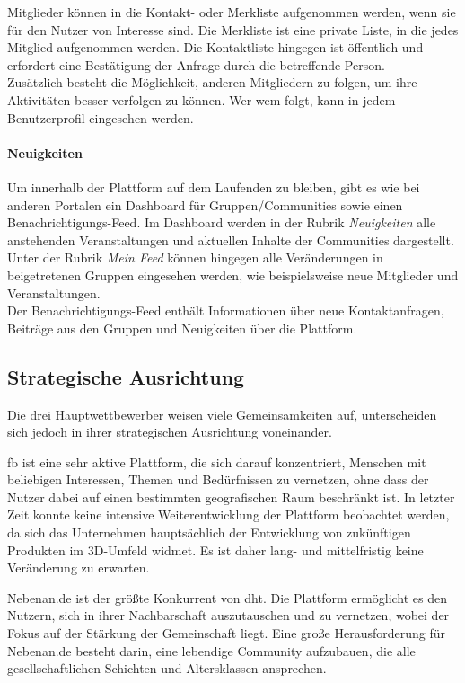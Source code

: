 Mitglieder können in die Kontakt- oder Merkliste aufgenommen werden, wenn sie für den Nutzer von Interesse sind. Die Merkliste ist eine private Liste, in die jedes Mitglied aufgenommen werden. Die Kontaktliste hingegen ist öffentlich und erfordert eine Bestätigung der Anfrage durch die betreffende Person. \\
Zusätzlich besteht die Möglichkeit, anderen Mitgliedern zu folgen, um ihre Aktivitäten besser verfolgen zu können. Wer wem folgt, kann in jedem Benutzerprofil eingesehen werden.

\paragraph{Neuigkeiten}

Um innerhalb der Plattform auf dem Laufenden zu bleiben, gibt es wie bei anderen Portalen ein Dashboard für Gruppen/Communities sowie einen Benachrichtigungs-Feed. Im Dashboard werden in der Rubrik \textit{Neuigkeiten} alle anstehenden Veranstaltungen und aktuellen Inhalte der Communities dargestellt. Unter der Rubrik \textit{Mein Feed} können hingegen alle Veränderungen in beigetretenen Gruppen eingesehen werden, wie beispielsweise neue Mitglieder und Veranstaltungen.\\
Der Benachrichtigungs-Feed enthält Informationen über neue Kontaktanfragen, Beiträge aus den Gruppen und Neuigkeiten über die Plattform.

\subsection{Strategische Ausrichtung}

Die drei Hauptwettbewerber weisen viele Gemeinsamkeiten auf, unterscheiden sich jedoch in ihrer strategischen Ausrichtung voneinander.

\acrshort{fb} ist eine sehr aktive Plattform, die sich darauf konzentriert, Menschen mit beliebigen Interessen, Themen und Bedürfnissen zu vernetzen, ohne dass der Nutzer dabei auf einen bestimmten geografischen Raum beschränkt ist. In letzter Zeit konnte keine intensive Weiterentwicklung der Plattform beobachtet werden, da sich das Unternehmen hauptsächlich der Entwicklung von zukünftigen Produkten im 3D-Umfeld widmet. Es ist daher lang- und mittelfristig keine Veränderung zu erwarten.

Nebenan.de ist der größte Konkurrent von \acrshort{dht}. Die Plattform ermöglicht es den Nutzern, sich in ihrer Nachbarschaft auszutauschen und zu vernetzen, wobei der Fokus auf der Stärkung der Gemeinschaft liegt. Eine große Herausforderung für Nebenan.de besteht darin, eine lebendige Community aufzubauen, die alle gesellschaftlichen Schichten und Altersklassen ansprechen.

